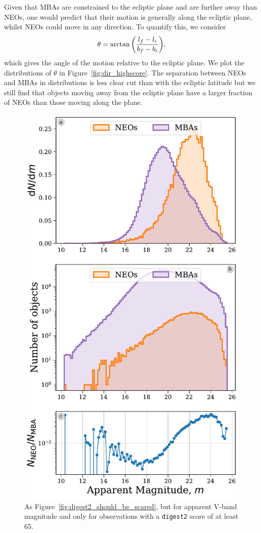 \documentclass[twocolumn, twocolappendix]{aastex631}
\newcommand{\dig}{\texttt{digest2}}
\begin{document}
Given that MBAs are constrained to the ecliptic plane and are further away than NEOs, one would predict that their motion is generally along the ecliptic plane, whilst NEOs could move in any direction. To quantify this, we consider
\begin{equation}
    \theta = \arctan \qty( \frac{l_f - l_i}{b_f - b_i} ),
\end{equation}
which gives the angle of the motion relative to the ecliptic plane. We plot the distributions of $\theta$ in Figure~\ref{fig:dir_highscore}. The separation between NEOs and MBAs in distributions is less clear cut than with the ecliptic latitude but we still find that objects moving away from the ecliptic plane have a larger fraction of NEOs than those moving along the plane.

\begin{figure}[htb]
    \centering
    \includegraphics[width=\columnwidth]{figures/apparent_mag_dist_highscore.pdf}
    \caption{As Figure~\ref{fig:digest2_should_be_scared}, but for apparent V-band magnitude and only for observations with a \dig{} score of at least 65.}
    \label{fig:app_mag_highscore}
\end{figure}
\end{document}
